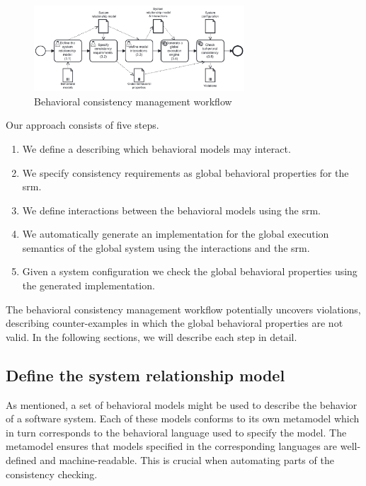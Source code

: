 \documentclass{jot}
\begin{document}
\begin{figure}[h]
    \centering
    \includegraphics[width=0.7\textwidth]{figures/workflow.pdf}
    \caption{Behavioral consistency management workflow}
    \label{fig:approach}
\end{figure}

Our approach consists of five steps.
\begin{enumerate}
    \item We define a  describing which behavioral models may interact.
    \item We specify consistency requirements as global behavioral properties for the \gls*{srm}.
    \item We define interactions between the behavioral models using the \gls*{srm}.
    \item We automatically generate an implementation for the global execution semantics of the global system
    using the interactions and the \gls*{srm}.
    \item Given a system configuration we check the global behavioral properties using the generated implementation.
\end{enumerate}
The behavioral consistency management workflow potentially uncovers violations, describing counter-examples in which the global behavioral properties are not valid.
In the following sections, we will describe each step in detail.

\subsection{Define the system relationship model}\label{sec:system-rel-model}

As mentioned, a set of behavioral models might be used to describe the behavior of a software system.
Each of these models conforms to its own metamodel which in turn corresponds to the behavioral language used to specify the model.
The metamodel ensures that models specified in the corresponding languages are well-defined and machine-readable.
This is crucial when automating parts of the consistency checking.
\end{document}
